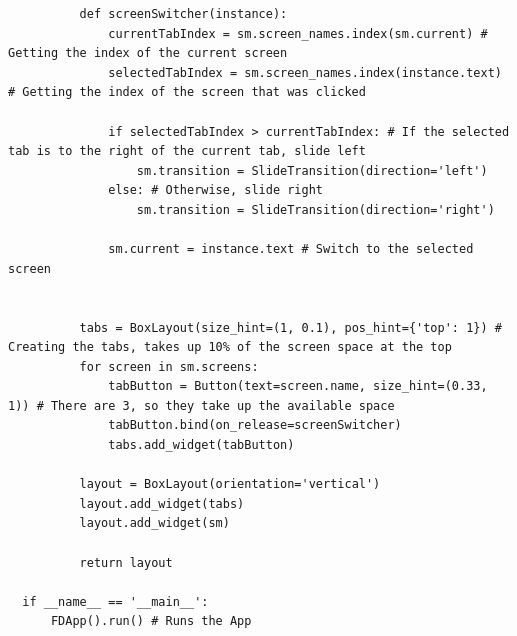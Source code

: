 \documentclass{article}
\begin{document}
\begin{verbatim}
          def screenSwitcher(instance):
              currentTabIndex = sm.screen_names.index(sm.current) # Getting the index of the current screen
              selectedTabIndex = sm.screen_names.index(instance.text) # Getting the index of the screen that was clicked

              if selectedTabIndex > currentTabIndex: # If the selected tab is to the right of the current tab, slide left
                  sm.transition = SlideTransition(direction='left')
              else: # Otherwise, slide right
                  sm.transition = SlideTransition(direction='right')

              sm.current = instance.text # Switch to the selected screen


          tabs = BoxLayout(size_hint=(1, 0.1), pos_hint={'top': 1}) # Creating the tabs, takes up 10% of the screen space at the top
          for screen in sm.screens:
              tabButton = Button(text=screen.name, size_hint=(0.33, 1)) # There are 3, so they take up the available space
              tabButton.bind(on_release=screenSwitcher)
              tabs.add_widget(tabButton)

          layout = BoxLayout(orientation='vertical')
          layout.add_widget(tabs)
          layout.add_widget(sm)

          return layout

  if __name__ == '__main__':
      FDApp().run() # Runs the App
\end{verbatim}
\vspace{0.5cm}
\end{document}
